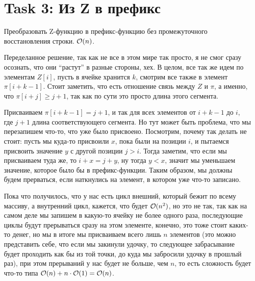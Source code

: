\section{Task 3: Из Z в префикс}
\begin{task}
    Преобразовать Z-функцию в префикс-функцию без промежуточного восстановления строки. $\mathcal{O}(n)$.
\end{task}

\begin{solution}
    Переделанное решение, так как не все в этом мире так просто, я не смог сразу осознать, что они ``растут'' в разные стороны, хех.
    В целом, все так же идем по элементам $Z[i]$, пусть в ячейке хранится $k$, смотрим все также в элемент $\pi[i + k - 1]$. Стоит заметить, что есть отношение связь между $Z$ и $\pi$, а именно, что $\pi[i + j] \geq j + 1$, так как по сути это просто длина этого сегмента.

    Присваиваем $\pi[i + k - 1] = j + 1$, и так для всех элементов от $i + k - 1$ до $i$, где $j + 1$ длина соответствующего сегмента. Но тут может быть проблема, что мы перезапишем что-то, что уже было присвоено.
    Посмотрим, почему так делать не стоит: пусть мы куда-то присвоили $x$, пока были на позиции $i$, и пытаемся присвоить значение $y$ с другой позиции $j > i$.
    Тогда заметим, что если мы присваиваем туда же, то $i + x = j + y$, ну тогда $y < x$, значит мы уменьшаем значение, которое было бы в префикс-функции. Таким образом, мы должны будем прерваться, если наткнулись на элемент, в котором уже что-то записано.

    Пока что получилось, что у нас есть цикл внешний, который бежит по всему массиву, а внутренний цикл, кажется, что будет $\mathcal{O}(n^2)$, но это не так, так как на самом деле мы запишем в какую-то ячейку не более одного раза, последующие циклы будут прерываться сразу на этом элементе, конечно, это тоже стоит каких-то денег, но мы в итоге мы присваиваем всего лишь $n$ элементов (это можно представить себе, что если мы закинули удочку, то следующее забрасывание будет проходить как бы из той точки, до куда мы забросили удочку в прошлый раз), при этом прерываний у нас будет не больше, чем $n$, то есть сложность будет что-то типа $\mathcal{O}(n) + n\cdot\mathcal{O}(1) = \mathcal{O}(n)$.
\end{solution}